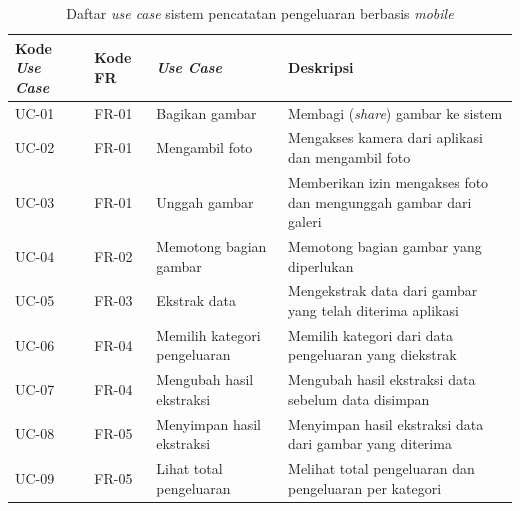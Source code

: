 \begin{table}[h!]
\centering
\caption{Daftar \emph{use case} sistem pencatatan pengeluaran berbasis \emph{mobile}}
\label{tab:use-case-list}
\begin{tabularx}{\textwidth}{|p{1.6cm}|p{1.5cm}|p{2.8cm}|X|}
\hline
\textbf{Kode \emph{Use Case}} & \textbf{Kode FR} & \textbf{\emph{Use Case}} & \textbf{Deskripsi} \\ \hline
UC-01 & FR-01 & Bagikan gambar & Membagi (\emph{share}) gambar ke sistem \\ \hline
UC-02 & FR-01 & Mengambil foto & Mengakses kamera dari aplikasi dan mengambil foto \\ \hline
UC-03 & FR-01 & Unggah gambar & Memberikan izin mengakses foto dan mengunggah gambar dari galeri \\ \hline
UC-04 & FR-02 & Memotong bagian gambar & Memotong bagian gambar yang diperlukan \\ \hline
UC-05 & FR-03 & Ekstrak data & Mengekstrak data dari gambar yang telah diterima aplikasi \\ \hline
UC-06 & FR-04 & Memilih kategori pengeluaran & Memilih kategori dari data pengeluaran yang diekstrak \\ \hline
UC-07 & FR-04 & Mengubah hasil ekstraksi & Mengubah hasil ekstraksi data sebelum data disimpan \\ \hline
UC-08 & FR-05 & Menyimpan hasil ekstraksi & Menyimpan hasil ekstraksi data dari gambar yang diterima \\ \hline
UC-09 & FR-05 & Lihat total pengeluaran & Melihat total pengeluaran dan pengeluaran per kategori \\ \hline
\end{tabularx}
\end{table}